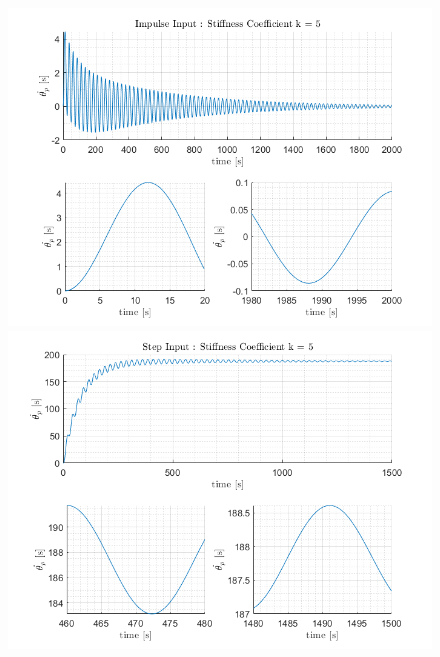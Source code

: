 \documentclass[letterpaper,12pt]{article}
\begin{document}
\begin{figure}[ht]
    \centering
    \includegraphics[scale = .8]{Images/Impulse_k5.png}
    \includegraphics[scale = .8]{Images/StepInput_k5.png}
\end{figure}
\end{document}
